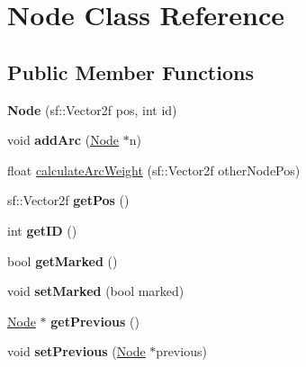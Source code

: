 \hypertarget{class_node}{}\section{Node Class Reference}
\label{class_node}
\subsection*{Public Member Functions}
\begin{DoxyCompactItemize}
\item 
\mbox{\label{class_node_a895a106b9d0954d8c12b63ce602bc023}} 
{\bfseries Node} (sf\+::\+Vector2f pos, int id)
\item 
\mbox{\label{class_node_a54fc4e9571a82fa8518994f44b067f31}} 
void {\bfseries add\+Arc} (\mbox{\hyperlink{class_node}{Node}} $\ast$n)
\item 
float \mbox{\hyperlink{class_node_a5f6014a8a8d873312eaf12303305a939}{calculate\+Arc\+Weight}} (sf\+::\+Vector2f other\+Node\+Pos)
\item 
\mbox{\label{class_node_ae9a4a95cb9db8edaab906e655f565757}} 
sf\+::\+Vector2f {\bfseries get\+Pos} ()
\item 
\mbox{\label{class_node_a8dd9a1d6ac9638fd1168283ad47e5127}} 
int {\bfseries get\+ID} ()
\item 
\mbox{\label{class_node_a68db6b1bbbf8d5e3d67b13fc1940ab7f}} 
bool {\bfseries get\+Marked} ()
\item 
\mbox{\label{class_node_acae0df9df948547644b89814f1ba1c2f}} 
void {\bfseries set\+Marked} (bool marked)
\item 
\mbox{\label{class_node_a0a81fcd9f6bd8cf43f8ccab295411283}} 
\mbox{\hyperlink{class_node}{Node}} $\ast$ {\bfseries get\+Previous} ()
\item 
\mbox{\label{class_node_af8c0c4e1ecf2f6a49dd899e2a57c14fb}} 
void {\bfseries set\+Previous} (\mbox{\hyperlink{class_node}{Node}} $\ast$previous)
\item 
\mbox{\label{class_node_a3e121b2968b4a04dc7a8c50fbad63045}} 

\end{DoxyCompactItemize}
